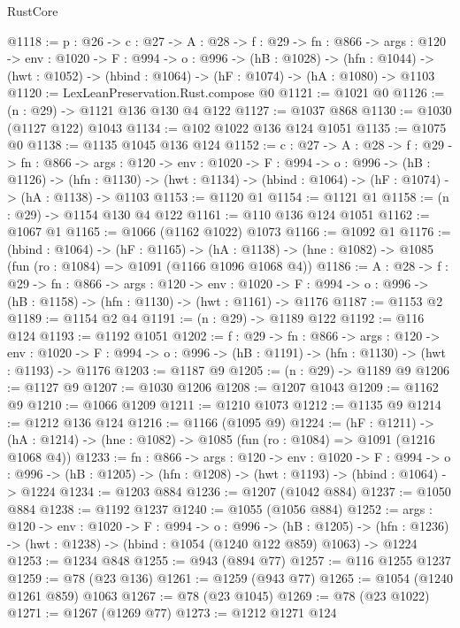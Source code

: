\begin{lexlean}{RustCore}
\begin{coremodule}
@1118 := {p : @26} ->
  {c : @27} ->
  {A : @28} ->
  {f : @29} ->
  {fn : @866} ->
  {args : @120} ->
  {env : @1020} ->
  {F : @994} ->
  {o : @996} ->
  (hB : @1028) ->
  (hfn : @1044) -> (hwt : @1052) -> (hbind : @1064) -> (hF : @1074) -> (hA : @1080) -> @1103
@1120 := LexLeanPreservation.Rust.compose @0
@1121 := @1021 @0
@1126 := (n : @29) -> @1121 @136 @130 @4 @122
@1127 := @1037 @868
@1130 := @1030 (@1127 @122) @1043
@1134 := @102 @1022 @136 @124 @1051
@1135 := @1075 @0
@1138 := @1135 @1045 @136 @124
@1152 := {c : @27} ->
  {A : @28} ->
  {f : @29} ->
  {fn : @866} ->
  {args : @120} ->
  {env : @1020} ->
  {F : @994} ->
  {o : @996} ->
  (hB : @1126) ->
  (hfn : @1130) -> (hwt : @1134) -> (hbind : @1064) -> (hF : @1074) -> (hA : @1138) -> @1103
@1153 := @1120 @1
@1154 := @1121 @1
@1158 := (n : @29) -> @1154 @130 @4 @122
@1161 := @110 @136 @124 @1051
@1162 := @1067 @1
@1165 := @1066 (@1162 @1022) @1073
@1166 := @1092 @1
@1176 := (hbind : @1064) ->
  (hF : @1165) ->
  (hA : @1138) -> (hne : @1082) -> @1085 (fun (ro : @1084) => @1091 (@1166 @1096 @1068 @4))
@1186 := {A : @28} ->
  {f : @29} ->
  {fn : @866} ->
  {args : @120} ->
  {env : @1020} ->
  {F : @994} -> {o : @996} -> (hB : @1158) -> (hfn : @1130) -> (hwt : @1161) -> @1176
@1187 := @1153 @2
@1189 := @1154 @2 @4
@1191 := (n : @29) -> @1189 @122
@1192 := @116 @124
@1193 := @1192 @1051
@1202 := {f : @29} ->
  {fn : @866} ->
  {args : @120} ->
  {env : @1020} ->
  {F : @994} -> {o : @996} -> (hB : @1191) -> (hfn : @1130) -> (hwt : @1193) -> @1176
@1203 := @1187 @9
@1205 := (n : @29) -> @1189 @9
@1206 := @1127 @9
@1207 := @1030 @1206
@1208 := @1207 @1043
@1209 := @1162 @9
@1210 := @1066 @1209
@1211 := @1210 @1073
@1212 := @1135 @9
@1214 := @1212 @136 @124
@1216 := @1166 (@1095 @9)
@1224 := (hF : @1211) ->
  (hA : @1214) -> (hne : @1082) -> @1085 (fun (ro : @1084) => @1091 (@1216 @1068 @4))
@1233 := {fn : @866} ->
  {args : @120} ->
  {env : @1020} ->
  {F : @994} ->
  {o : @996} -> (hB : @1205) -> (hfn : @1208) -> (hwt : @1193) -> (hbind : @1064) -> @1224
@1234 := @1203 @884
@1236 := @1207 (@1042 @884)
@1237 := @1050 @884
@1238 := @1192 @1237
@1240 := @1055 (@1056 @884)
@1252 := {args : @120} ->
  {env : @1020} ->
  {F : @994} ->
  {o : @996} ->
  (hB : @1205) -> (hfn : @1236) -> (hwt : @1238) -> (hbind : @1054 (@1240 @122 @859) @1063) -> @1224
@1253 := @1234 @848
@1255 := @943 (@894 @77)
@1257 := @116 @1255 @1237
@1259 := @78 (@23 @136)
@1261 := @1259 (@943 @77)
@1265 := @1054 (@1240 @1261 @859) @1063
@1267 := @78 (@23 @1045)
@1269 := @78 (@23 @1022)
@1271 := @1267 (@1269 @77)
@1273 := @1212 @1271 @124

\end{coremodule}
\end{lexlean}
